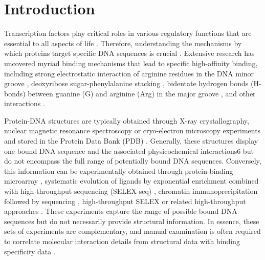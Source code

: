 \section{Introduction} 

Transcription factors play critical roles in various regulatory functions that are essential to all aspects of life \citep{Spitz2012}. Therefore, understanding the mechanisms by which proteins target specific DNA sequences is crucial \citep{Zhao2009}. Extensive research has uncovered myriad binding mechanisms that lead to specific high-affinity binding, including strong electrostatic interaction of arginine residues in the DNA minor groove \citep{rohs2009role}, deoxyribose sugar-phenylalanine stacking \citep{stirnimann2010structural}, bidentate hydrogen bonds (H-bonds) between guanine (G) and arginine (Arg) in the major groove \citep{Helene1977}, and other interactions \citep{Rohs2010,Schildbach1999,Seeman1976}.
\par
Protein-DNA structures are typically \citep{Garvie2001} obtained through X-ray crystallography, nuclear magnetic resonance spectroscopy or cryo-electron microscopy experiments and stored in the Protein Data Bank (PDB) \citep{berman2000protein}. Generally, these structures display one bound DNA sequence and the associated physicochemical interactions6 but do not encompass the full range of potentially bound DNA sequences. Conversely, this information can be experimentally obtained through protein-binding microarray \citep{Berger2009}, systematic evolution of ligands by exponential enrichment combined with high-throughput sequencing (SELEX-seq) \citep{Slattery2011}, chromatin immunoprecipitation followed by sequencing \citep{Park2009}, high-throughput SELEX \citep{Jolma2013} or related high-throughput approaches \citep{Slattery2014}. These experiments capture the range of possible bound DNA sequences but do not necessarily provide structural information. In essence, these sets of experiments are complementary, and manual examination is often required to correlate molecular interaction details from structural data with binding specificity data \citep{rohs2009role}.
\par
